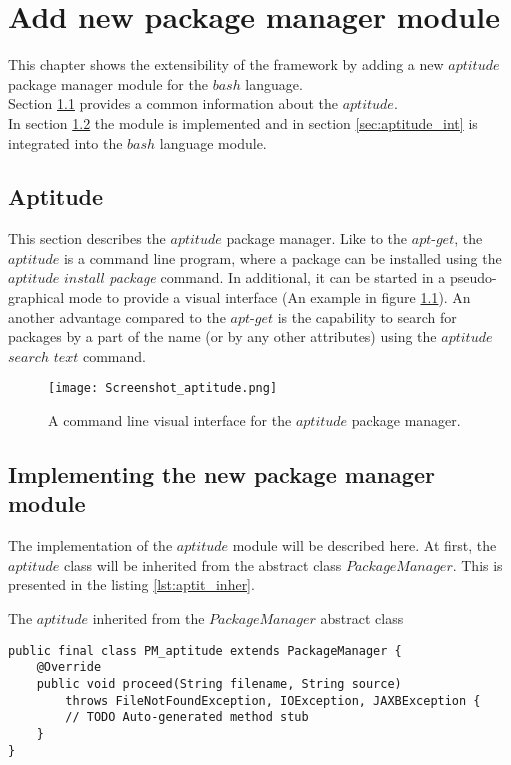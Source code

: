 
\chapter{Add new package manager module}\label{chap:add}
This chapter shows the extensibility of the framework by adding a new $aptitude$ package manager module for the $bash$ language.\\
Section \ref{sec:aptitude} provides a common information about the $aptitude$.\\
In section \ref{sec:aptitude_imp} the module is implemented and in section \ref{sec:aptitude_int} is integrated into the $bash$ language module.

\section{Aptitude}\label{sec:aptitude}
This section describes the $aptitude$ package manager.
Like to the $apt$-$get$, the $aptitude$ is a command line program, where a package can be installed using the $aptitude$ $install$ \emph{package} command. 
In additional, it can be started in a pseudo-graphical mode to provide a visual interface (An example in figure \ref{fig:aptitude_gui}).
An another advantage compared to the $apt$-$get$ is the capability to search for packages by a part of the name (or by any other attributes) using the $aptitude$ $search$ $text$ command.
\begin{figure}[ht]   
	\centering
	\texttt{[image: Screenshot\_aptitude.png]}
	\caption{A command line visual interface for the $aptitude$ package manager.}
	\label{fig:aptitude_gui}
\end{figure}

\section{Implementing the new package manager module}\label{sec:aptitude_imp}
The implementation of the $aptitude$ module will be described here.
At first, the $aptitude$ class will be inherited from the abstract class $PackageManager$. 
This is presented in the listing \ref{lst:aptit_inher}.\\
\begin{Listing} 
\caption{The $aptitude$ inherited from the $PackageManager$ abstract class}
\label{lst:aptit_inher}
\begin{lstlisting}
public final class PM_aptitude extends PackageManager {
	@Override
	public void proceed(String filename, String source)
		throws FileNotFoundException, IOException, JAXBException {
		// TODO Auto-generated method stub
	}
}
\end{lstlisting}
\end{Listing} 

